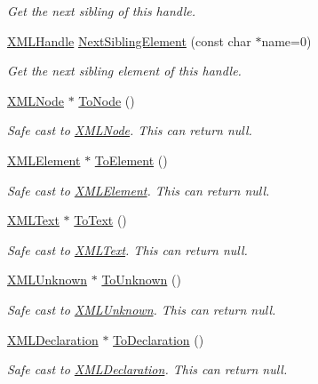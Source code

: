 \begin{DoxyCompactItemize}
\begin{DoxyCompactList}\small\item\em Get the next sibling of this handle. \end{DoxyCompactList}\item 
\hyperlink{classtinyxml2_1_1_x_m_l_handle}{X\+M\+L\+Handle} \hyperlink{classtinyxml2_1_1_x_m_l_handle_ae41d88ee061f3c49a081630ff753b2c5}{Next\+Sibling\+Element} (const char $\ast$name=0)
\begin{DoxyCompactList}\small\item\em Get the next sibling element of this handle. \end{DoxyCompactList}\item 
\hyperlink{classtinyxml2_1_1_x_m_l_node}{X\+M\+L\+Node} $\ast$ \hyperlink{classtinyxml2_1_1_x_m_l_handle_a03ea6ec970a021b71bf1219a0f6717df}{To\+Node} ()
\begin{DoxyCompactList}\small\item\em Safe cast to \hyperlink{classtinyxml2_1_1_x_m_l_node}{X\+M\+L\+Node}. This can return null. \end{DoxyCompactList}\item 
\hyperlink{classtinyxml2_1_1_x_m_l_element}{X\+M\+L\+Element} $\ast$ \hyperlink{classtinyxml2_1_1_x_m_l_handle_a5e73ed8f3f6f9619d5a8bb1862c47d99}{To\+Element} ()
\begin{DoxyCompactList}\small\item\em Safe cast to \hyperlink{classtinyxml2_1_1_x_m_l_element}{X\+M\+L\+Element}. This can return null. \end{DoxyCompactList}\item 
\hyperlink{classtinyxml2_1_1_x_m_l_text}{X\+M\+L\+Text} $\ast$ \hyperlink{classtinyxml2_1_1_x_m_l_handle_a6ab9e8cbfb41417246e5657e3842c62a}{To\+Text} ()
\begin{DoxyCompactList}\small\item\em Safe cast to \hyperlink{classtinyxml2_1_1_x_m_l_text}{X\+M\+L\+Text}. This can return null. \end{DoxyCompactList}\item 
\hyperlink{classtinyxml2_1_1_x_m_l_unknown}{X\+M\+L\+Unknown} $\ast$ \hyperlink{classtinyxml2_1_1_x_m_l_handle_aa387368a1ad8d843a9f12df863d298de}{To\+Unknown} ()
\begin{DoxyCompactList}\small\item\em Safe cast to \hyperlink{classtinyxml2_1_1_x_m_l_unknown}{X\+M\+L\+Unknown}. This can return null. \end{DoxyCompactList}\item 
\hyperlink{classtinyxml2_1_1_x_m_l_declaration}{X\+M\+L\+Declaration} $\ast$ \hyperlink{classtinyxml2_1_1_x_m_l_handle_a108858be7ee3eb53f73b5194c1aa8ff0}{To\+Declaration} ()
\begin{DoxyCompactList}\small\item\em Safe cast to \hyperlink{classtinyxml2_1_1_x_m_l_declaration}{X\+M\+L\+Declaration}. This can return null. \end{DoxyCompactList}\end{DoxyCompactItemize}


